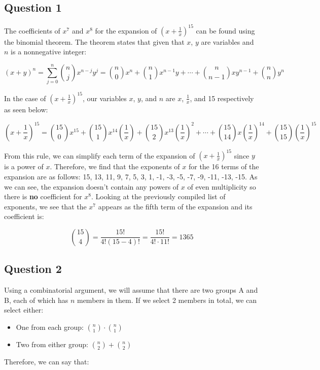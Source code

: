 \documentclass[letterpaper, 12pt]{article}
\begin{document}
\subsection*{Question 1}
The coefficients of $x^7$ and $x^8$ for the expansion of $(x + \frac{1}{x})^{15}$ can be found using the binomial theorem. The theorem states that given that $x$, $y$ are variables and $n$ is a nonnegative integer:

\[(x+y)^n = \sum_{j=0}^{n} \binom{n}{j}x^{n-j}y^j = \binom{n}{0}x^n + \binom{n}{1}x^{n-1}y + \cdots + \binom{n}{n-1}xy^{n-1} + \binom{n}{n}y^n\]

In the case of $(x + \frac{1}{x})^{15}$, our variables $x$, $y$, and $n$ are $x$, $\frac{1}{x}$, and 15 respectively as seen below:

\[\left(x+ \frac{1}{x}\right)^{15} = \binom{15}{0}x^{15} + \binom{15}{1}x^{14}\left(\frac{1}{x}\right) + \binom{15}{2}x^{13}\left(\frac{1}{x}\right)^2 + \cdots + \binom{15}{14}x\left(\frac{1}{x}\right)^{14} + \binom{15}{15}\left(\frac{1}{x}\right)^{15}\]

From this rule, we can simplify each term of the expansion of $(x + \frac{1}{x})^{15}$ since $y$ is a power of $x$. Therefore, we find that the exponents of $x$ for the 16 terms of the expansion are as follows: 15, 13, 11, 9, 7, 5, 3, 1, -1, -3, -5, -7, -9, -11, -13, -15. As we can see, the expansion doesn't contain any powers of $x$ of even multiplicity so there is \textbf{no} coefficient for $x^8$. Looking at the previously compiled list of exponents, we see that the $x^7$ appears as the fifth term of the expansion and its coefficient is:

\[\binom{15}{4} = \frac{15!}{4!(15-4)!} = \frac{15!}{4! \cdot 11!} = 1365\]

\subsection*{Question 2}
Using a combinatorial argument, we will assume that there are two groups A and B, each of which has $n$ members in them. If we select 2 members in total, we can select either:

\begin{itemize}
    \item One from each group: $\binom{n}{1} \cdot \binom{n}{1}$
    \item Two from either group: $\binom{n}{2} + \binom{n}{2}$
\end{itemize}

Therefore, we can say that:
\end{document}
